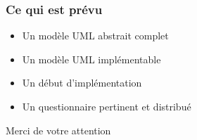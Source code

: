 \documentclass{beamer}
\begin{document}
  \begin{frame}
   \frametitle{Ce qui est prévu}
   \begin{itemize}
    \item Un modèle UML abstrait complet
    \item Un modèle UML implémentable
    \item Un début d'implémentation
    \item Un questionnaire pertinent et distribué
   \end{itemize}
  \end{frame}

  \begin{frame}
    \begin{center}
      Merci de votre attention
    \end{center}
  \end{frame}
\end{document}
